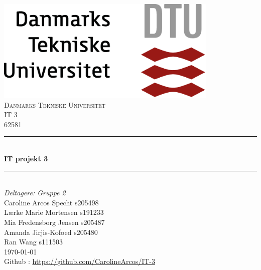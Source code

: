 


\begin{titlepage}


\newcommand{\HRule}{\rule{\linewidth}{0.5mm}} 							%
\center 
 
 \includegraphics[width=0.8\textwidth]{Billeder/dtu.png}\\[1cm] 	%
\vfill 
\textsc{\LARGE Danmarks Tekniske Universitet}\\[1cm]

\textsc{\Large IT 3}\\[0.2cm]
\textsc{\large 62581}\\[1cm] 										%
\HRule \\[0.8cm]
{ \huge \bfseries IT projekt 3}\\[0.7cm]								%
\HRule \\[2cm]
\large
\emph{Deltagere: Gruppe 2 }\\

Caroline Arcos Specht s205498\\	
Lærke  Marie Mortensen s191233\\	
Mia Fredensborg Jensen s205487\\
Amanda Jirjis-Kofoed s205480\\
Ran Wang s111503\\[1.5cm]	
\today \\
Github :  \url{https://github.com/CarolineArcos/IT-3} 

\end{titlepage}